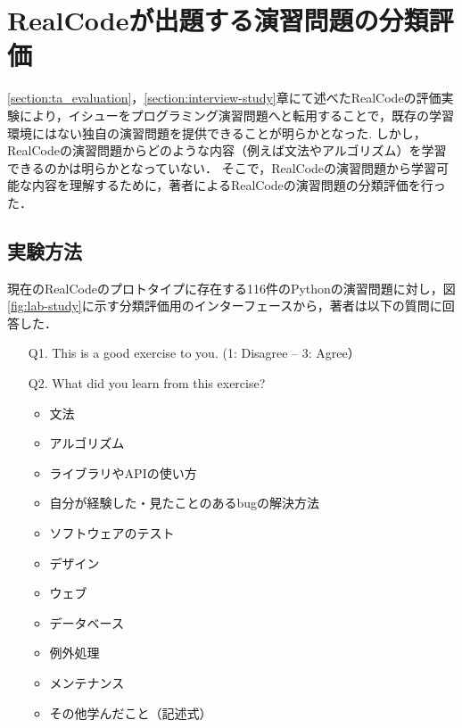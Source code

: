 
\chapter{RealCodeが出題する演習問題の分類評価}
\label{section:lab-study}
\graphicspath{{Chapters_evaluation/Figs/}}


\ref{section:ta_evaluation}，\ref{section:interview-study}章にて述べたRealCodeの評価実験により，イシューをプログラミング演習問題へと転用することで，既存の学習環境にはない独自の演習問題を提供できることが明らかとなった.
しかし，RealCodeの演習問題からどのような内容（例えば文法やアルゴリズム）を学習できるのかは明らかとなっていない．
そこで，RealCodeの演習問題から学習可能な内容を理解するために，著者によるRealCodeの演習問題の分類評価を行った．


\section{実験方法}

現在のRealCodeのプロトタイプに存在する116件のPythonの演習問題に対し，図\ref{fig:lab-study}に示す分類評価用のインターフェースから，著者は以下の質問に回答した．

\begin{itemize}
  \item[Q1.] This is a good exercise to you. (1: Disagree -- 3: Agree）
  \item[Q2.] What did you learn from this exercise?
  \begin{itemize}
  	  \item 文法
   	  \item アルゴリズム
      \item ライブラリやAPIの使い方
      \item 自分が経験した・見たことのあるbugの解決方法
      \item ソフトウェアのテスト
      \item デザイン
      \item ウェブ
      \item データベース
      \item 例外処理
      \item メンテナンス
      \item その他学んだこと（記述式）
  \end{itemize}
\end{itemize}

